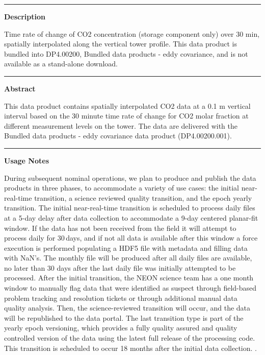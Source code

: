 \documentclass[]{article}
\begin{document}
\begin{center}\rule{0.5\linewidth}{\linethickness}\end{center}

\textbf{Description}

Time rate of change of CO2 concentration (storage component only) over
30 min, spatially interpolated along the vertical tower profile. This
data product is bundled into DP4.00200, Bundled data products - eddy
covariance, and is not available as a stand-alone download.

\begin{center}\rule{0.5\linewidth}{\linethickness}\end{center}

\textbf{Abstract}

This data product contains spatially interpolated CO2 data at a 0.1 m
vertical interval based on the 30 minute time rate of change for CO2
molar fraction at different measurement levels on the tower. The data
are delivered with the Bundled data products - eddy covariance data
product (DP4.00200.001).

\begin{center}\rule{0.5\linewidth}{\linethickness}\end{center}

\textbf{Usage Notes}

During subsequent nominal operations, we plan to produce and publish the
data products in three phases, to accommodate a variety of use cases:
the initial near-real-time transition, a science reviewed quality
transition, and the epoch yearly transition. The initial near-real-time
transition is scheduled to process daily files at a 5-day delay after
data collection to accommodate a 9-day centered planar-fit window. If
the data has not been received from the field it will attempt to process
daily for 30\,days, and if not all data is available after this window a
force execution is performed populating a HDF5 file with metadata and
filling data with NaN's. The monthly file will be produced after all
daily files are available, no later than 30 days after the last daily
file was initially attempted to be processed. After the initial
transition, the NEON science team has a one month window to manually
flag data that were identified as suspect through field-based problem
tracking and resolution tickets or through additional manual data
quality analysis. Then, the science-reviewed transition will occur, and
the data will be republished to the data portal. The last transition
type is part of the yearly epoch versioning, which provides a fully
quality assured and quality controlled version of the data using the
latest full release of the processing code. This transition is scheduled
to occur 18 months after the initial data collection. \newpage
.
\end{document}
